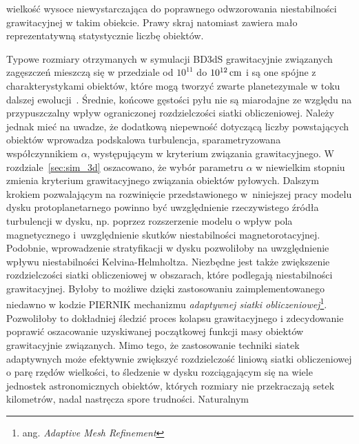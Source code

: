 wielkość wysoce niewystarczająca do poprawnego odwzorowania niestabilności
grawitacyjnej w takim obiekcie.  Prawy skraj natomiast zawiera mało
reprezentatywną statystycznie liczbę obiektów.
%
\par Typowe rozmiary otrzymanych w symulacji BD3dS grawitacyjnie związanych
zagęszczeń mieszczą się w przedziale od $10^{11}$ do $10^{12}\hbox{$\thinspace\textrm{cm}$}$ i są one spójne z
charakterystykami obiektów, które mogą tworzyć zwarte planetezymale w toku
dalszej ewolucji~\cite{HS08}. Średnie, końcowe gęstości pyłu nie są miarodajne
ze względu na przypuszczalny wpływ ograniczonej rozdzielczości siatki
obliczeniowej. Należy jednak mieć na uwadze, że dodatkową niepewność dotyczącą
liczby powstających obiektów wprowadza podskalowa turbulencja, sparametryzowana
współczynnikiem $\alpha$, występującym w kryterium związania
grawitacyjnego.
W rozdziale~\ref{sec:sim_3d} oszacowano, że wybór parametru $\alpha$ w
niewielkim stopniu zmienia kryterium grawitacyjnego związania obiektów pyłowych.
Dalszym krokiem pozwalającym na rozwinięcie przedstawionego w~niniejszej pracy
modelu dysku protoplanetarnego powinno być uwzględnienie rzeczywistego źródła
turbulencji w dysku, np. poprzez rozszerzenie modelu o wpływ pola magnetycznego
i~uwzględnienie skutków niestabilności magnetorotacyjnej. Podobnie, wprowadzenie
stratyfikacji w dysku pozwoliłoby na uwzględnienie wpływu niestabilności
Kelvina-Helmholtza.  Niezbędne jest także zwiększenie rozdzielczości siatki
obliczeniowej w obszarach, które podlegają niestabilności grawitacyjnej. Byłoby
to możliwe dzięki zastosowaniu zaimplementowanego niedawno w kodzie
\textsc{PIERNIK} mechanizmu \emph{adaptywnej siatki obliczeniowej}\footnote{ang.
\emph{Adaptive Mesh Refinement}}. Pozwoliłoby to dokładniej śledzić proces
kolapsu grawitacyjnego i zdecydowanie poprawić oszacowanie uzyskiwanej
początkowej funkcji masy obiektów grawitacyjnie związanych.  Mimo tego, że
zastosowanie techniki siatek adaptywnych może efektywnie zwiększyć rozdzielczość
liniową siatki obliczeniowej o parę rzędów wielkości, to śledzenie w dysku
rozciągającym się na wiele jednostek astronomicznych obiektów, których rozmiary
nie przekraczają setek kilometrów, nadal nastręcza spore trudności.  Naturalnym
